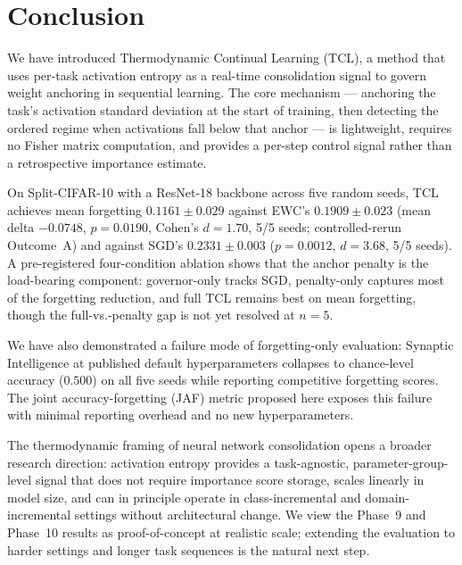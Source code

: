 
\section{Conclusion}
\label{sec:conclusion}

We have introduced Thermodynamic Continual Learning (TCL), a method that uses per-task
activation entropy as a real-time consolidation signal to govern weight anchoring in
sequential learning.
The core mechanism --- anchoring the task's activation standard deviation at the start
of training, then detecting the ordered regime when activations fall below that anchor
--- is lightweight, requires no Fisher matrix computation, and provides a per-step
control signal rather than a retrospective importance estimate.

On Split-CIFAR-10 with a ResNet-18 backbone across five random seeds, TCL achieves
mean forgetting $0.1161 \pm 0.029$ against EWC's $0.1909 \pm 0.023$
(mean delta $-0.0748$, $p = 0.0190$, Cohen's $d = 1.70$, 5/5 seeds; controlled-rerun
Outcome~A) and against SGD's $0.2331 \pm 0.003$
($p = 0.0012$, $d = 3.68$, 5/5 seeds).
A pre-registered four-condition ablation shows that the anchor penalty is the
load-bearing component: governor-only tracks SGD, penalty-only captures most of the
forgetting reduction, and full TCL remains best on mean forgetting, though the
full-vs.-penalty gap is not yet resolved at $n=5$.

We have also demonstrated a failure mode of forgetting-only evaluation: Synaptic
Intelligence at published default hyperparameters collapses to chance-level accuracy
($0.500$) on all five seeds while reporting competitive forgetting scores.
The joint accuracy-forgetting (JAF) metric proposed here exposes this failure with
minimal reporting overhead and no new hyperparameters.

The thermodynamic framing of neural network consolidation opens a broader research
direction: activation entropy provides a task-agnostic, parameter-group-level signal
that does not require importance score storage, scales linearly in model size, and
can in principle operate in class-incremental and domain-incremental settings without
architectural change.
We view the Phase~9 and Phase~10 results as proof-of-concept at realistic scale;
extending the evaluation to harder settings and longer task sequences is the natural
next step.
